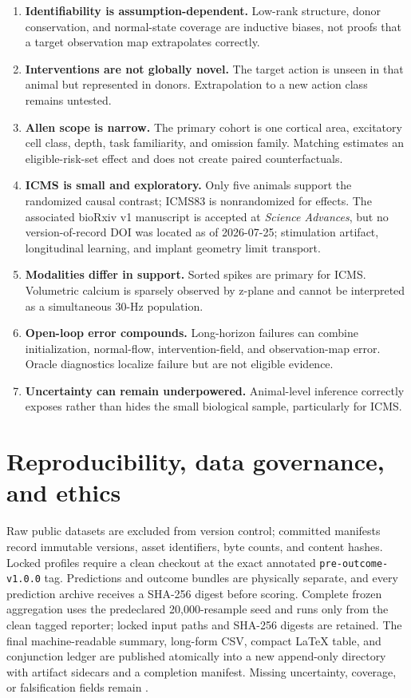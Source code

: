 \documentclass[11pt]{article}
\newcommand{\code}[1]{\texttt{#1}}
\begin{document}
\begin{enumerate}[leftmargin=*]
  \item \textbf{Identifiability is assumption-dependent.} Low-rank structure,
    donor conservation, and normal-state coverage are inductive biases, not
    proofs that a target observation map extrapolates correctly.
  \item \textbf{Interventions are not globally novel.} The target action is
    unseen in that animal but represented in donors. Extrapolation to a new
    action class remains untested.
  \item \textbf{Allen scope is narrow.} The primary cohort is one cortical
    area, excitatory cell class, depth, task familiarity, and omission family.
    Matching estimates an eligible-risk-set effect and does not create paired
    counterfactuals.
  \item \textbf{ICMS is small and exploratory.} Only five animals support the
    randomized causal contrast; ICMS83 is nonrandomized for effects. The
    associated bioRxiv v1 manuscript is accepted at \emph{Science Advances},
    but no version-of-record DOI was located as of 2026-07-25; stimulation
    artifact, longitudinal learning, and implant geometry limit transport.
  \item \textbf{Modalities differ in support.} Sorted spikes are primary for
    ICMS. Volumetric calcium is sparsely observed by z-plane and cannot be
    interpreted as a simultaneous 30-Hz population.
  \item \textbf{Open-loop error compounds.} Long-horizon failures can combine
    initialization, normal-flow, intervention-field, and observation-map
    error. Oracle diagnostics localize failure but are not eligible evidence.
  \item \textbf{Uncertainty can remain underpowered.} Animal-level inference
    correctly exposes rather than hides the small biological sample,
    particularly for ICMS.
\end{enumerate}

\section{Reproducibility, data governance, and ethics}

Raw public datasets are excluded from version control; committed manifests
record immutable versions, asset identifiers, byte counts, and content hashes.
Locked profiles require a clean checkout at the exact annotated
\code{pre-outcome-v1.0.0} tag. Predictions and outcome bundles are physically
separate, and every prediction archive receives a SHA-256 digest before
scoring. Complete frozen aggregation uses the predeclared 20,000-resample seed
and runs only from the clean tagged reporter; locked input paths and SHA-256
digests are retained. The final machine-readable summary, long-form CSV,
compact \LaTeX{} table, and conjunction ledger are published atomically into a
new append-only directory with artifact sidecars and a completion manifest.
Missing uncertainty, coverage, or falsification fields remain
\NotEvaluated{}.
\end{document}
